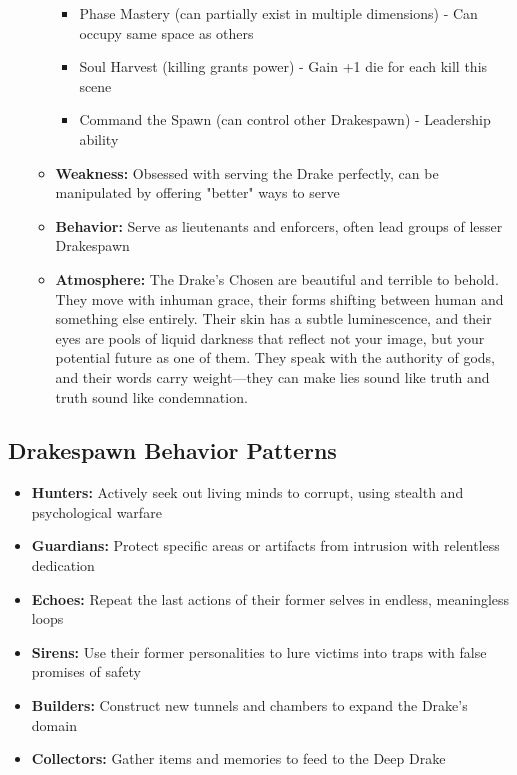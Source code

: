 \documentclass[11pt]{article}
\begin{document}
\begin{itemize}
\begin{itemize}
\begin{itemize}
    \item Phase Mastery (can partially exist in multiple dimensions) - Can occupy same space as others
    \item Soul Harvest (killing grants power) - Gain +1 die for each kill this scene
    \item Command the Spawn (can control other Drakespawn) - Leadership ability
    \end{itemize}
  \item \textbf{Weakness:} Obsessed with serving the Drake perfectly, can be manipulated by offering "better" ways to serve
  \item \textbf{Behavior:} Serve as lieutenants and enforcers, often lead groups of lesser Drakespawn
  \item \textbf{Atmosphere:} The Drake's Chosen are beautiful and terrible to behold. They move with inhuman grace, their forms shifting between human and something else entirely. Their skin has a subtle luminescence, and their eyes are pools of liquid darkness that reflect not your image, but your potential future as one of them. They speak with the authority of gods, and their words carry weight—they can make lies sound like truth and truth sound like condemnation.
  \end{itemize}
\end{itemize}

\subsection{Drakespawn Behavior Patterns}
\begin{itemize}
\item \textbf{Hunters:} Actively seek out living minds to corrupt, using stealth and psychological warfare
\item \textbf{Guardians:} Protect specific areas or artifacts from intrusion with relentless dedication
\item \textbf{Echoes:} Repeat the last actions of their former selves in endless, meaningless loops
\item \textbf{Sirens:} Use their former personalities to lure victims into traps with false promises of safety
\item \textbf{Builders:} Construct new tunnels and chambers to expand the Drake's domain
\item \textbf{Collectors:} Gather items and memories to feed to the Deep Drake
\end{itemize}
\end{document}
